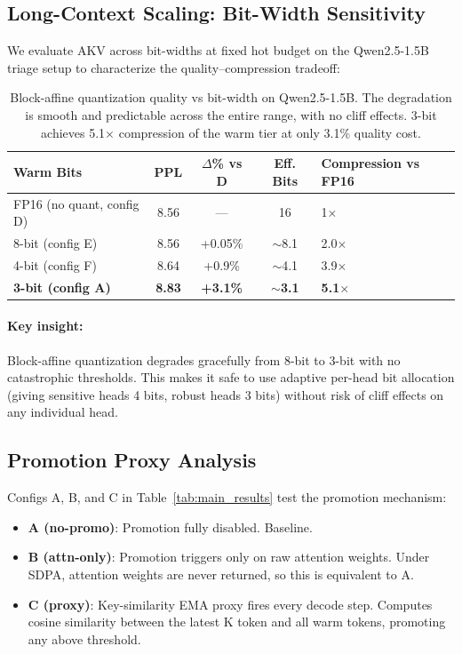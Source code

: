 \documentclass[11pt,a4paper]{article}
\begin{document}
\subsection{Long-Context Scaling: Bit-Width Sensitivity}

We evaluate AKV across bit-widths at fixed hot budget on the Qwen2.5-1.5B triage setup to characterize the quality--compression tradeoff:

\begin{table}[h]
\centering
\begin{tabular}{lcccl}
\toprule
\textbf{Warm Bits} & \textbf{PPL} & \textbf{$\Delta$\% vs D} & \textbf{Eff. Bits} & \textbf{Compression vs FP16} \\
\midrule
FP16 (no quant, config D) & 8.56 & --- & 16 & 1$\times$ \\
8-bit (config E) & 8.56 & +0.05\% & $\sim$8.1 & 2.0$\times$ \\
4-bit (config F) & 8.64 & +0.9\% & $\sim$4.1 & 3.9$\times$ \\
\textbf{3-bit (config A)} & \textbf{8.83} & \textbf{+3.1\%} & $\sim$\textbf{3.1} & \textbf{5.1$\times$} \\
\bottomrule
\end{tabular}
\caption{Block-affine quantization quality vs bit-width on Qwen2.5-1.5B. The degradation is smooth and predictable across the entire range, with no cliff effects. 3-bit achieves 5.1$\times$ compression of the warm tier at only 3.1\% quality cost.}
\label{tab:hot_budget}
\end{table}

\paragraph{Key insight:} Block-affine quantization degrades gracefully from 8-bit to 3-bit with no catastrophic thresholds. This makes it safe to use adaptive per-head bit allocation (giving sensitive heads 4 bits, robust heads 3 bits) without risk of cliff effects on any individual head.

\subsection{Promotion Proxy Analysis}

Configs A, B, and C in Table~\ref{tab:main_results} test the promotion mechanism:
\begin{itemize}
    \item \textbf{A (no-promo)}: Promotion fully disabled. Baseline.
    \item \textbf{B (attn-only)}: Promotion triggers only on raw attention weights. Under SDPA, attention weights are never returned, so this is equivalent to A.
    \item \textbf{C (proxy)}: Key-similarity EMA proxy fires every decode step. Computes cosine similarity between the latest K token and all warm tokens, promoting any above threshold.
\end{itemize}
\end{document}
